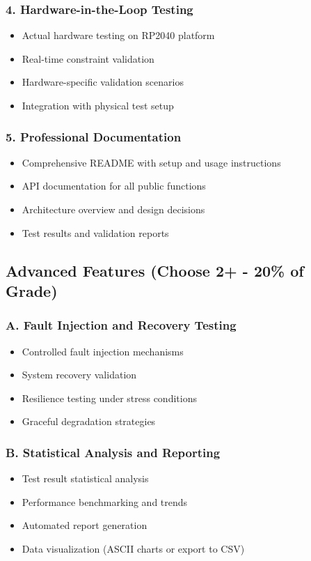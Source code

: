 \documentclass[11pt,a4paper]{article}
\begin{document}
\subsubsection{4. Hardware-in-the-Loop Testing}
\begin{itemize}
    \item Actual hardware testing on RP2040 platform
    \item Real-time constraint validation
    \item Hardware-specific validation scenarios
    \item Integration with physical test setup
\end{itemize}

\subsubsection{5. Professional Documentation}
\begin{itemize}
    \item Comprehensive README with setup and usage instructions
    \item API documentation for all public functions
    \item Architecture overview and design decisions
    \item Test results and validation reports
\end{itemize}

\subsection{Advanced Features (Choose 2+ - 20\% of Grade)}

\subsubsection{A. Fault Injection and Recovery Testing}
\begin{itemize}
    \item Controlled fault injection mechanisms
    \item System recovery validation
    \item Resilience testing under stress conditions
    \item Graceful degradation strategies
\end{itemize}

\subsubsection{B. Statistical Analysis and Reporting}
\begin{itemize}
    \item Test result statistical analysis
    \item Performance benchmarking and trends
    \item Automated report generation
    \item Data visualization (ASCII charts or export to CSV)
\end{itemize}
\end{document}
